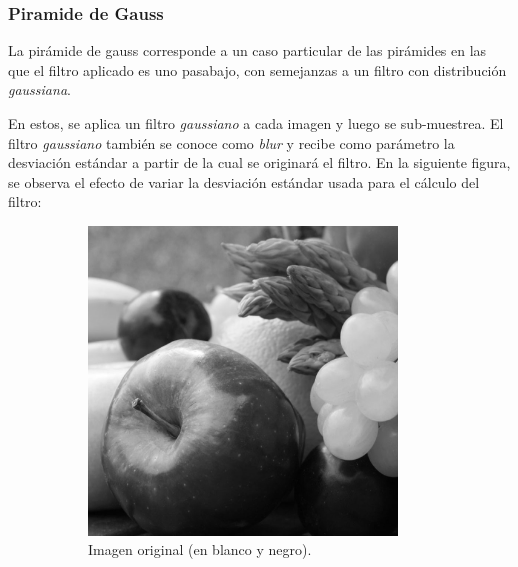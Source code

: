 \subsubsection{Piramide de Gauss}
La pirámide de gauss corresponde a un caso particular de las pirámides en las que el filtro aplicado es uno pasabajo, con semejanzas a un filtro con distribución \textit{gaussiana}. 

\par En estos, se aplica un filtro \textit{gaussiano} a cada imagen y luego se sub-muestrea. El filtro  \textit{gaussiano} también se conoce como \textit{blur} y recibe como parámetro la desviación estándar a partir de la cual se originará el filtro. En la siguiente figura, se observa el efecto de variar la desviación estándar usada para el cálculo del filtro:

\begin{figure}[H]
  \centering
  \begin{subfigure}[t]{0.32\textwidth}
    \centering
    \includegraphics[width = 0.9\textwidth]{frutas.png}
    \caption{Imagen original (en blanco y negro).}
  \end{subfigure}
  ~
  \begin{subfigure}[t]{0.32\textwidth}
      \centering

\end{subfigure}
\end{figure}
